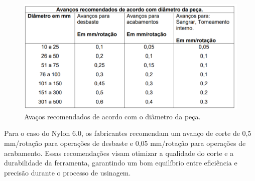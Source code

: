 \begin{figure}[h!]
    \centering
    \includegraphics[width=0.7\linewidth]{images/avanco.png}
    \caption{Avaços recomendados de acordo com o diâmetro da peça.}
    \label{fig:enter-label}
\end{figure}

Para o caso do Nylon 6.0, os fabricantes recomendam um avanço de corte de 0,5 mm/rotação para operações de desbaste e 0,05 mm/rotação para operações de acabamento. Essas recomendações visam otimizar a qualidade do corte e a durabilidade da ferramenta, garantindo um bom equilíbrio entre eficiência e precisão durante o processo de usinagem.